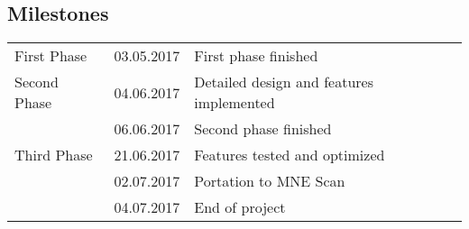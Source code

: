 \subsection{Milestones}
\begin{tabular}{lll}
	First Phase & 03.05.2017 & First phase finished\\
	Second Phase & 04.06.2017 & Detailed design and features implemented\\
				& 06.06.2017 & Second phase finished\\
	Third Phase & 21.06.2017 & Features tested and optimized\\          
				& 02.07.2017 & Portation to MNE Scan\\
				& 04.07.2017 & End of project\\
\end{tabular}

